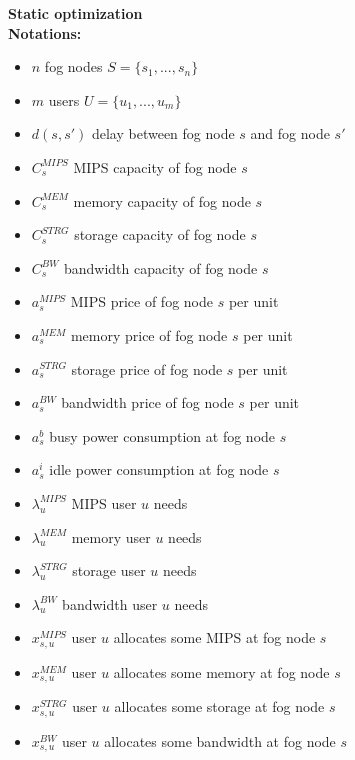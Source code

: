 \documentclass{article}
\begin{document}
\noindent\textbf{Static optimization}\\[12pt]
\noindent\textbf{Notations:}
\begin{itemize}
	\item $n$ fog nodes $S=\{s_1, ..., s_n\}$
	\item $m$ users $U=\{u_1, ..., u_m\}$
	\item $d(s, s')$ delay between fog node $s$ and fog node $s'$\\
	
	\item $C^{MIPS}_{s}$ MIPS capacity of fog node $s$
	\item $C^{MEM}_{s}$ memory capacity of fog node $s$
	\item $C^{STRG}_{s}$ storage capacity of fog node $s$
	\item $C^{BW}_{s}$ bandwidth capacity of fog node $s$\\
	
	\item $a^{MIPS}_{s}$ MIPS price of fog node $s$ per unit
	\item $a^{MEM}_{s}$ memory price of fog node $s$ per unit
	\item $a^{STRG}_{s}$ storage price of fog node $s$ per unit
	\item $a^{BW}_{s}$ bandwidth price of fog node $s$ per unit
	\item $a^b_{s}$ busy power consumption at fog node $s$
	\item $a^i_{s}$ idle power consumption at fog node $s$\\
	
	\item $\lambda^{MIPS}_{u}$ MIPS user $u$ needs
	\item $\lambda^{MEM}_{u}$ memory user $u$ needs
	\item $\lambda^{STRG}_{u}$ storage user $u$ needs
	\item $\lambda^{BW}_{u}$ bandwidth user $u$ needs\\
	
	\item $x^{MIPS}_{s,u}$ user $u$ allocates some MIPS at fog node $s$
	\item $x^{MEM}_{s,u}$ user $u$ allocates some memory at fog node $s$
	\item $x^{STRG}_{s,u}$ user $u$ allocates some storage at fog node $s$
	\item $x^{BW}_{s,u}$ user $u$ allocates some bandwidth at fog node $s$\\
\end{itemize}
\end{document}
